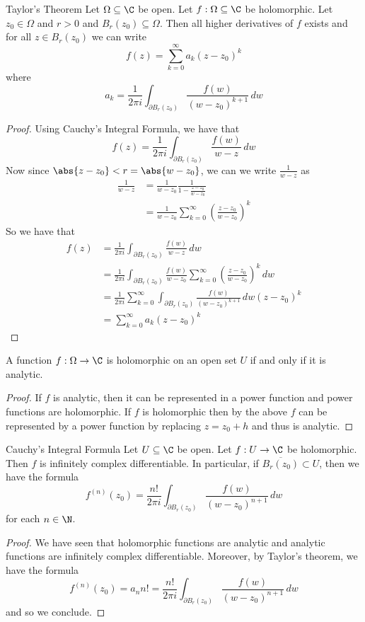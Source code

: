 \documentclass[a4paper]{article}
\begin{document}
\begin{thm}{Taylor's Theorem}{} Let $\Omega\subseteq\C$ be open. Let $f:\Omega\subseteq\C$ be holomorphic. Let $z_0\in\Omega$ and $r>0$ and $B_r(z_0)\subseteq\Omega$. Then all higher derivatives of $f$ exists and for all $z\in B_r(z_0)$ we can write $$f(z)=\sum_{k=0}^\infty a_k(z-z_0)^k$$ where $$a_k=\frac{1}{2\pi i}\int_{\partial B_r(z_0)}\frac{f(w)}{(w-z_0)^{k+1}}\,dw$$ 
\begin{proof} Using Cauchy's Integral Formula, we have that $$f(z)=\frac{1}{2\pi i}\int_{\partial B_r(z_0)}\frac{f(w)}{w-z}\,dw$$ Now since $\abs{z-z_0}<r=\abs{w-z_0}$, we can we write $\frac{1}{w-z}$ as 
\begin{align*}
\frac{1}{w-z}&=\frac{1}{w-z_0}\frac{1}{1-\frac{z-z_0}{w-z_0}}\\
&=\frac{1}{w-z_0}\sum_{k=0}^\infty\left(\frac{z-z_0}{w-z_0}\right)^k
\end{align*}
So we have that 
\begin{align*}
f(z)&=\frac{1}{2\pi i}\int_{\partial B_r(z_0)}\frac{f(w)}{w-z}\,dw\\
&=\frac{1}{2\pi i}\int_{\partial B_r(z_0)}\frac{f(w)}{w-z_0}\sum_{k=0}^\infty\left(\frac{z-z_0}{w-z_0}\right)^k\,dw\\
&=\frac{1}{2\pi i}\sum_{k=0}^\infty\int_{\partial B_r(z_0)}\frac{f(w)}{(w-z_0)^{k+1}}\,dw(z-z_0)^k\\
&=\sum_{k=0}^\infty a_k(z-z_0)^k
\end{align*}
\end{proof}
\end{thm}

\begin{crl}{}{} A function $f:\Omega\to\C$ is holomorphic on an open set $U$ if and only if it is analytic. 
\begin{proof} If $f$ is analytic, then it can be represented in a power function and power functions are holomorphic. If $f$ is holomorphic then by the above $f$ can be represented by a power function by replacing $z=z_0+h$ and thus is analytic. 
\end{proof}
\end{crl}

\begin{thm}{Cauchy's Integral Formula}{} Let $U\subseteq\C$ be open. Let $f:U\to\C$ be holomorphic. Then $f$ is infinitely complex differentiable. In particular, if $\overline{B_r(z_0)}\subset U$, then we have the formula $$f^{(n)}(z_0)=\frac{n!}{2\pi i}\int_{\partial B_r(z_0)}\frac{f(w)}{(w-z_0)^{n+1}}\,dw$$ for each $n\in\N$. 
\begin{proof}
We have seen that holomorphic functions are analytic and analytic functions are infinitely complex differentiable. Moreover, by Taylor's theorem, we have the formula $$f^{(n)}(z_0)=a_nn!=\frac{n!}{2\pi i}\int_{\partial B_r(z_0)}\frac{f(w)}{(w-z_0)^{n+1}}\,dw$$ and so we conclude. 
\end{proof}
\end{thm}
\end{document}
